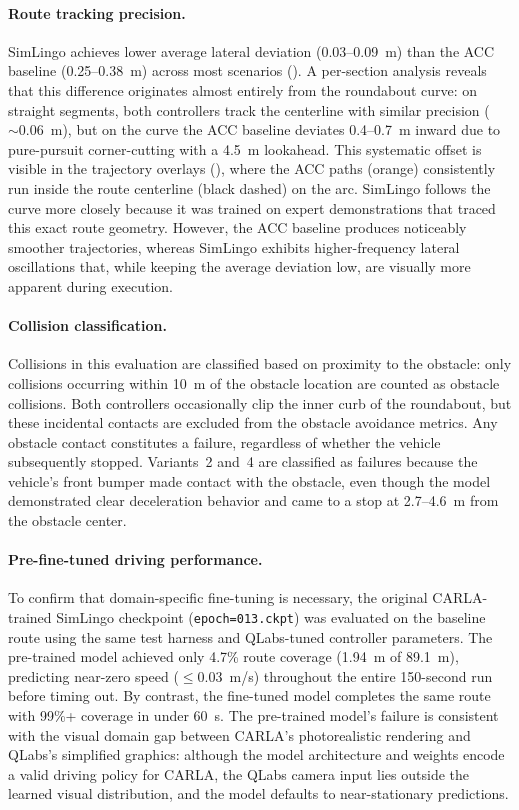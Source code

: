 \paragraph{Route tracking precision.}
SimLingo achieves lower average lateral deviation (0.03--0.09~m) than the ACC baseline (0.25--0.38~m) across most scenarios (). A per-section analysis reveals that this difference originates almost entirely from the roundabout curve: on straight segments, both controllers track the centerline with similar precision (${\sim}0.06$~m), but on the curve the ACC baseline deviates 0.4--0.7~m inward due to pure-pursuit corner-cutting with a 4.5~m lookahead. This systematic offset is visible in the trajectory overlays (), where the ACC paths (orange) consistently run inside the route centerline (black dashed) on the arc. SimLingo follows the curve more closely because it was trained on expert demonstrations that traced this exact route geometry. However, the ACC baseline produces noticeably smoother trajectories, whereas SimLingo exhibits higher-frequency lateral oscillations that, while keeping the average deviation low, are visually more apparent during execution.

\paragraph{Collision classification.}
Collisions in this evaluation are classified based on proximity to the obstacle: only collisions occurring within 10~m of the obstacle location are counted as obstacle collisions. Both controllers occasionally clip the inner curb of the roundabout, but these incidental contacts are excluded from the obstacle avoidance metrics. Any obstacle contact constitutes a failure, regardless of whether the vehicle subsequently stopped. Variants~2 and~4 are classified as failures because the vehicle's front bumper made contact with the obstacle, even though the model demonstrated clear deceleration behavior and came to a stop at 2.7--4.6~m from the obstacle center.

\paragraph{Pre-fine-tuned driving performance.}
To confirm that domain-specific fine-tuning is necessary, the original CARLA-trained SimLingo checkpoint (\texttt{epoch=013.ckpt}) was evaluated on the baseline route using the same test harness and QLabs-tuned controller parameters. The pre-trained model achieved only 4.7\% route coverage (1.94~m of 89.1~m), predicting near-zero speed (${\le}0.03$~m/s) throughout the entire 150-second run before timing out. By contrast, the fine-tuned model completes the same route with 99\%+ coverage in under 60~s. The pre-trained model's failure is consistent with the visual domain gap between CARLA's photorealistic rendering and QLabs's simplified graphics: although the model architecture and weights encode a valid driving policy for CARLA, the QLabs camera input lies outside the learned visual distribution, and the model defaults to near-stationary predictions.

